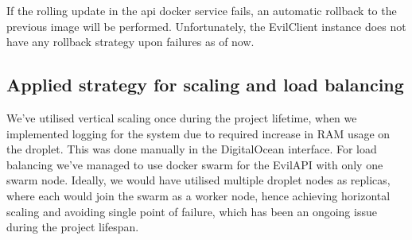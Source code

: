 \documentclass[report/main.tex]{subfiles}
\begin{document}
\begin{enumerate}
            If the rolling update in the api docker service fails, an automatic rollback to the previous image will be performed. Unfortunately, the EvilClient instance does not have any rollback strategy upon failures as of now.  
            
        \end{enumerate}
        
        
        \subsection{Applied strategy for scaling and load balancing}
        
        We've utilised vertical scaling once during the project lifetime, when we implemented logging for the system due to required increase in RAM usage on the droplet. This was done manually in the DigitalOcean interface. For load balancing we've managed to use docker swarm for the EvilAPI with only one swarm node. Ideally, we would have utilised multiple droplet nodes as replicas, where each would join the swarm as a worker node, hence achieving horizontal scaling and avoiding single point of failure, which has been an ongoing issue during the project lifespan.  
        
            
\end{document}
